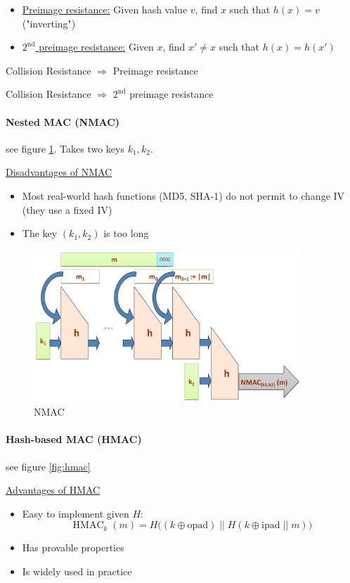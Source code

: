 \begin{itemize}
    \item \underline{Preimage resistance:} Given hash value $v$, find $x$ such that $h(x) = v$ ("inverting")
    \item \underline{$2^{\text{nd}}$ preimage resistance:} Given $x$, find $x' \neq x$ such that $h(x) = h(x')$
\end{itemize}

Collision Resistance $\Rightarrow$ Preimage resistance

Collision Resistance $\Rightarrow$ $2^{\text{nd}}$ preimage resistance

\paragraph{Nested MAC (NMAC)} see figure \ref{fig:nmac}. Takes two keys $k_1, k_2$.

\underline{Disadvantages of NMAC}

\begin{itemize}
    \item Most real-world hash functions (MD5, SHA-1) do not permit to change IV (they use a fixed IV)
    \item The key $(k_1, k_2)$ is too long
\end{itemize}

\begin{figure}[h]
    \centering
    \includegraphics[width=10cm]{images/ch4-nmac.png}
    \caption{NMAC}
    \label{fig:nmac}
\end{figure}

\paragraph{Hash-based MAC (HMAC)} see figure \ref{fig:hmac}

\underline{Advantages of HMAC}

\begin{itemize}
    \item Easy to implement given $H$:
        $$ \operatorname{HMAC}_k(m) = H\big( (k \oplus \text{opad} ) \; || \; H(k \oplus \text{ipad}\; || \; m ) \big) $$
        \item Has provable properties
        \item Is widely used in practice
\end{itemize}

